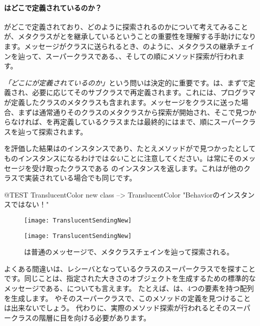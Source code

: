 \documentclass[a4paper,10pt,twoside]{book}
\begin{document}
\paragraph{はどこで定義されているのか？}
がどこで定義されており、どのように探索されるのかについて考えてみることが、メタクラスがとを継承しているということの重要性を理解する手助けになります。メッセージがクラスに送られるとき、のように、メタクラスの継承チェインを辿って、スーパークラスである、、そしての順にメソッド探索が行われます。

\emph{「どこにが定義されているのか」}という問いは決定的に重要です。は、まずで定義され、必要に応じてそのサブクラスで再定義されます。これには、プログラマが定義したクラスのメタクラスも含まれます。メッセージをクラスに送った場合、まずは通常通りそのクラスのメタクラスから探索が開始され、そこで見つからなければ、を再定義しているクラスまたは最終的にはまで、順にスーパークラスを辿って探索されます。

を評価した結果はのインスタンスであり、たとえメソッドがで見つかったとしてものインスタンスになるわけでは\emph{ない}ことに注意してください。は常にそのメッセージを受け取ったクラスである \self のインスタンスを返します。これはが他のクラスで実装されている場合でも同じです。

\begin{code}{@TEST}
TranslucentColor new class --> TranslucentColor    "Behaviorのインスタンスではない！"
\end{code}

\begin{center}
\begin{figure}
\ifluluelse
	{\centerline{\texttt{[image: TranslucentSendingNew]}}}
	{\centerline{\texttt{[image: TranslucentSendingNew]}}}
\caption{は普通のメッセージで、メタクラスチェインを辿って探索される。}
\end{figure}
\end{center}

よくある間違いは、レシーバとなっているクラスのスーパークラスでを探すことです。同じことは、指定された大きさのオブジェクトを生成するための標準的なメッセージである、についても言えます。
たとえば、は、4つの要素を持つ配列を生成します。
やそのスーパークラスで、このメソッドの定義を見つけることは出来ないでしょう。
代わりに、実際のメソッド探索が行われるとそのスーパークラスの階層に目を向ける必要があります。
\end{document}
